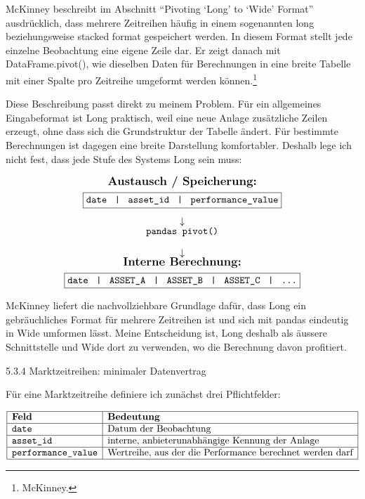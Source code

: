 \documentclass[
  ngerman,
  a4paper,
  DIV=11,
  oneside]{scrreprt}
\begin{document}
McKinney beschreibt im Abschnitt ``Pivoting `Long' to `Wide' Format''
ausdrücklich, dass mehrere Zeitreihen häufig in einem sogenannten long
beziehungsweise stacked format gespeichert werden. In diesem Format
stellt jede einzelne Beobachtung eine eigene Zeile dar. Er zeigt danach
mit DataFrame.pivot(), wie dieselben Daten für Berechnungen in eine
breite Tabelle mit einer Spalte pro Zeitreihe umgeformt werden
können.\footnote{McKinney.}

Diese Beschreibung passt direkt zu meinem Problem. Für ein allgemeines
Eingabeformat ist Long praktisch, weil eine neue Anlage zusätzliche
Zeilen erzeugt, ohne dass sich die Grundstruktur der Tabelle ändert. Für
bestimmte Berechnungen ist dagegen eine breite Darstellung komfortabler.
Deshalb lege ich nicht fest, dass jede Stufe des Systems Long sein muss:

\[
\begin{array}{c}
\text{\large \textbf{Austausch / Speicherung:}}
\\[4pt]
\boxed{\texttt{date \;|\; asset\_id \;|\; performance\_value}}
\\[10pt]
\downarrow
\\[-2pt]
\text{\texttt{pandas pivot()}}
\\[10pt]
\downarrow
\\[-2pt]
\text{\large \textbf{Interne Berechnung:}}
\\[4pt]
\boxed{\texttt{date \;|\; ASSET\_A \;|\; ASSET\_B \;|\; ASSET\_C \;|\; \ldots}}
\end{array}
\]

McKinney liefert die nachvollziehbare Grundlage dafür, dass Long ein
gebräuchliches Format für mehrere Zeitreihen ist und sich mit pandas
eindeutig in Wide umformen lässt. Meine Entscheidung ist, Long deshalb
als äussere Schnittstelle und Wide dort zu verwenden, wo die Berechnung
davon profitiert.

5.3.4 Marktzeitreihen: minimaler Datenvertrag

Für eine Marktzeitreihe definiere ich zunächst drei Pflichtfelder:

\[
\begin{array}{|l|l|}
\hline
\textbf{Feld} & \textbf{Bedeutung} \\
\hline
\texttt{date} & \text{Datum der Beobachtung} \\
\hline
\texttt{asset\_id} & \text{interne, anbieterunabhängige Kennung der Anlage} \\
\hline
\texttt{performance\_value} & \text{Wertreihe, aus der die Performance berechnet werden darf} \\
\hline
\end{array}
\]
\end{document}

